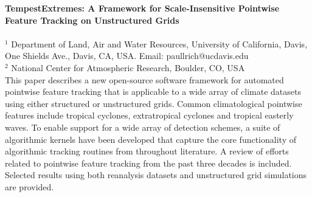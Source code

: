\documentclass[11pt]{article}
\begin{document}
\noindent \textbf{TempestExtremes:  A Framework for Scale-Insensitive Pointwise Feature Tracking on Unstructured Grids} \\

 \\

\noindent $^1$ Department of Land, Air and Water Resources, University of California, Davis, One Shields Ave., Davis, CA, USA.  Email: paullrich@ucdavis.edu \\

\noindent $^2$ National Center for Atmospheric Research, Boulder, CO, USA \\

\noindent This paper describes a new open-source software framework for automated pointwise feature tracking that is applicable to a wide array of climate datasets using either structured or unstructured grids.  Common climatological pointwise features include tropical cyclones, extratropical cyclones and tropical easterly waves.  To enable support for a wide array of detection schemes, a suite of algorithmic kernels have been developed that capture the core functionality of algorithmic tracking routines from throughout literature. A review of efforts related to pointwise feature tracking from the past three decades is included. Selected results using both reanalysis datasets and unstructured grid simulations are provided.
\end{document}
